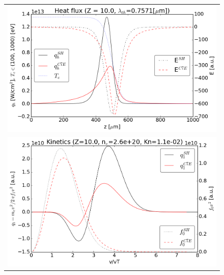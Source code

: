 \documentclass[preprint,12pt]{elsarticle}
\begin{document}
\begin{figure}[tbh]
  \begin{center}
    \begin{tabular}{c}
      \includegraphics[width=1.0\textwidth]{../results/fe_analysis/C7E/P5_heatflux_Z10_halfF.png} \\ 
      \includegraphics[width=1.0\textwidth]{../results/fe_analysis/C7E/P5_kinetics_Z10_halfF.png}
    \end{tabular}
  \caption{
  }
  \end{center}
  \label{fig:AWBScorrection_f1}
\end{figure}
\end{document}

